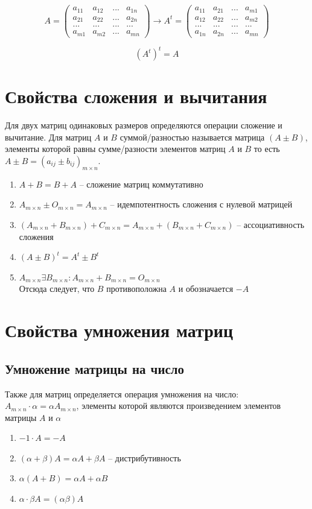 \documentclass[oneside]{book}
\begin{document}
\begin{enumerate}
\begin{itemize}
\begin{enumerate}
$$A=\begin{pmatrix} a_{1 1} & a_{1 2} & ... & a_{1 n}\\
a_{2 1} & a_{2 2} & ... & a_{2 n}\\ 
... & ... & ... & ...\\
a_{m 1} & a_{m 2} & ... & a_{m n}\end{pmatrix}
\to A^{t}=\begin{pmatrix} a_{1 1} & a_{2 1} & ... & a_{m 1}\\
a_{1 2} & a_{2 2} & ... & a_{m 2}\\ 
... & ... & ... & ...\\
a_{1 n} & a_{2 n} & ... & a_{m n}\end{pmatrix}$$

$$(A^{t})^{t}=A$$
\section{Свойства сложения и вычитания}
Для двух матриц одинаковых размеров определяются операции сложение и вычитание. Для матриц $A$ и $B$ суммой/разностью называется матрица $(A\pm B)$, элементы которой равны сумме/разности элементов матриц $A$ и $B$ то есть $A\pm B=(a_{i j}\pm b_{i j})_{m\times n}$.
\begin{enumerate}
\item $A+B=B+A$ -- сложение матриц коммутативно
\item $A_{m\times n}\pm O_{m\times n}=A_{m\times n}$ -- идемпотентность сложения с нулевой матрицей
\item $(A_{m\times n}+B_{m\times n})+C_{m\times n}=A_{m\times n}+(B_{m\times n}+C_{m\times n})$ -- ассоциативность сложения
\item $(A\pm B)^{t}=A^{t}\pm B^{t}$
\item $A_{m\times n} \exists B_{m\times n}: A_{m\times n}+B_{m\times n}= O_{m\times n}$\\
Отсюда следует, что $B$ противоположна $A$ и обозначается $-A$
\end{enumerate}

\section{Свойства умножения матриц}
\subsection{Умножение матрицы на число}
Также для матриц определяется операция умножения на число:\\
$A_{m\times n}\cdot \alpha=\alpha A_{m\times n}$, элементы которой являются произведением элементов матрицы $A$ и $\alpha$
\begin{enumerate}
\item $-1\cdot A=-A$
\item $(\alpha + \beta)A=\alpha A + \beta A$ -- дистрибутивность
\item $\alpha (A+B)= \alpha A + \alpha B$
\item $\alpha \cdot \beta A = (\alpha \beta) A$
\end{enumerate}

\end{enumerate}
\end{itemize}
\end{enumerate}
\end{document}
